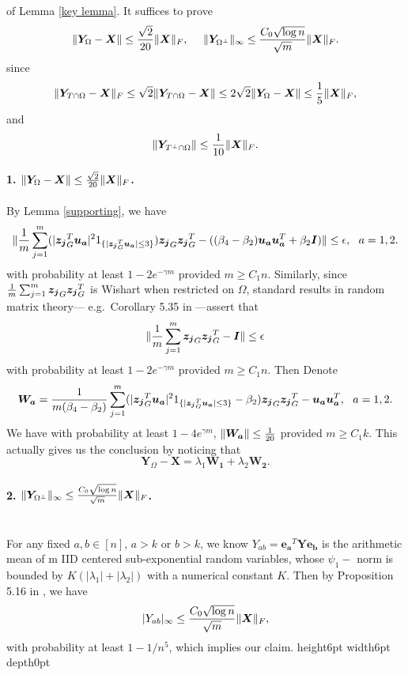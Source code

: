\documentclass[11pt]{article}
\newcommand{\<}{\langle}
\renewcommand{\>}{\rangle}
\newcommand{\vct}[1]{\bm{#1}}
\newcommand{\mtx}[1]{\bm{#1}}
\numberwithin{equation}{section}
\def \endprf{\hfill {\vrule height6pt width6pt depth0pt}\medskip}
\newenvironment{proof}{\noindent {\bf Proof} }{\endprf\par}
\begin{document}
\begin{proof} of Lemma \ref{key lemma}.
It suffices to prove
\[
\|\mtx{Y}_\Omega-\mtx{X}\|\leq {\sqrt{2}\over{20}}\|\mtx{X}\|_F,~~~~ \|\mtx{Y}_{\Omega^{\perp}}\|_\infty\leq 
{{C_0\sqrt{\log n}}\over{\sqrt{m}}}\|\mtx{X}\|_F.
\]
since
\[
\|\mtx{Y}_{T\cap \Omega}-\mtx{X}\|_F\leq \sqrt{2}\|\mtx{Y}_{T\cap \Omega}-\mtx{X}\|\leq 2\sqrt{2}\|\mtx{Y}_
{\Omega}-\mtx{X}\|\leq {1\over 5}\|\mtx{X}\|_F,
\]
and
\[
\|\mtx{Y}_{T^\perp\cap \Omega}\|\leq {1\over 10}\|\mtx{X}\|_F.
\]
\paragraph{1. $\|\mtx{Y}_\Omega-\mtx{X}\|\leq {\sqrt{2}\over{20}}\|\mtx{X}\|_F$.} By Lemma \ref{supporting}, we have 
\[
\|{1\over m}\sum_{j=1}^m (|{\vct{z_j}}_G^T\vct{u_a}|^21_{\{|{\vct{z_j}}_G^T\vct{u_a}|\leq 3\}}){\vct{z_j}}_G{\vct{z_j}}_G^T-
((\beta_4-\beta_2)\vct{u_a}\vct{u_a}^T+\beta_2\mtx{I})\|\leq \epsilon, ~~a=1,2.
\]
with probability at least $1-2e^{-\gamma m}$ provided $m\geq C_1 n$. Similarly, since ${1\over m}\sum_{j=1}^m {\vct{z_j}}_G
{\vct{z_j}}_G^T$ is Wishart when restricted on $\Omega$, standard results in random matrix theory---
e.g.~Corollary 5.35 in
\cite{VershyninRMT}---assert that
\[
\|{1\over m}\sum_{j=1}^m {\vct{z_j}}_G{\vct{z_j}}_G^T- \mtx{I} \| \leq \epsilon
\]
with probability at least $1-2e^{-\gamma m}$ provided $m\geq C_1 n$. Then Denote 
\[
\mtx{W_a}={1\over m(\beta_4-\beta_2)}\sum_{j=1}^m (|{\vct{z_j}}_G^T\vct{u_a}|^21_{\{|{\vct{z_j}}_G^T\vct{u_a}|\leq 
3\}}-\beta_2){\vct{z_j}}_G{\vct{z_j}}_G^T-\vct{u_a}\vct{u_a}^T, ~~a=1,2.
\]
We have with probability at least $1-4e^{\gamma m}$, $\|\mtx{W_a}\|\leq {1\over{20}}$ provided $m\geq C_1k$. This 
actually gives us the conclusion by noticing that 
\[
\mtx{Y}_\Omega-\mtx{X}=\lambda_1\mtx{W_1}+\lambda_2\mtx{W_2}.
\]



\paragraph{2. $\|\mtx{Y}_{\Omega^{\perp}}\|_\infty\leq {{C_0\sqrt{\log n}}\over{\sqrt{m}}}\|\mtx{X}\|_F$.}~\\
For any fixed $a, b \in [n]$, $a>k$ or $b>k$, we know $Y_{ab}=\vct{e_a}^T\mtx{Y}\vct{e_b}$ is the arithmetic mean of m IID 
centered sub-exponential random variables, whose $\psi_1-$ norm is bounded by $K(|\lambda_1|+|
\lambda_2|)$ 
with a numerical constant $K$. Then by Proposition 5.16 in \cite{VershyninRMT}, we have 
\[
|Y_{ab}|_\infty\leq {{C_0\sqrt{\log n}}\over{\sqrt{m}}}\|\mtx{X}\|_F,
\]
with probability at least $1-1/{n^5}$, which implies our claim.
\end{proof}
\end{document}
